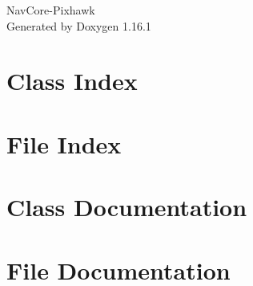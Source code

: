 \documentclass[twoside]{book}
\newcommand{\+}{\discretionary{\mbox{\scriptsize$\hookleftarrow$}}{}{}}
\newcommand{\clearemptydoublepage}{%
    \newpage{\pagestyle{empty}\cleardoublepage}%
  }
\begin{document}
  \raggedbottom
    \hypersetup{pageanchor=false,
                bookmarksnumbered=true,
                pdfencoding=unicode
               }
  \begin{titlepage}
  \vspace*{7cm}
  \begin{center}%
  {\Large Nav\+Core-\/\+Pixhawk}\\
  \vspace*{1cm}
  {\large Generated by Doxygen 1.16.1}\\
  \end{center}
  \end{titlepage}
  \clearemptydoublepage
  \tableofcontents
  \clearemptydoublepage
  \hypersetup{pageanchor=true}
\chapter{Class Index}

\chapter{File Index}

\chapter{Class Documentation}




\chapter{File Documentation}



  \backmatter
  \newpage
  \clearemptydoublepage
  \printindex
\end{document}
